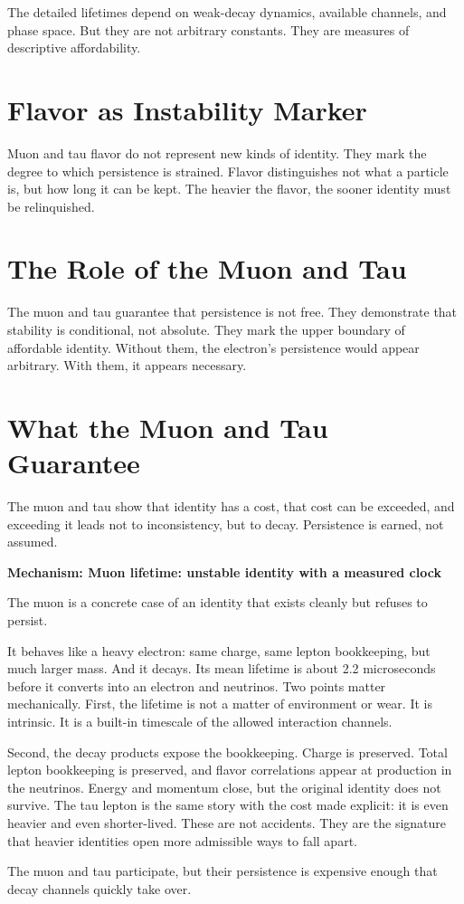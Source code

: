 \documentclass[11pt,twoside,openright]{book}
\newenvironment{mechanismbox}[1]
  {\begin{framed}\noindent\textbf{Mechanism: #1}\par\medskip}
  {\end{framed}}
\begin{document}
The detailed lifetimes depend on weak-decay dynamics, available channels, and phase space. But they are not arbitrary constants. They are measures of descriptive affordability.

\section*{Flavor as Instability Marker}

Muon and tau flavor do not represent new kinds of identity. They mark the degree to which persistence is strained. Flavor distinguishes not what a particle is, but how long it can be kept. The heavier the flavor, the sooner identity must be relinquished.

\section*{The Role of the Muon and Tau}

The muon and tau guarantee that persistence is not free. They demonstrate that stability is conditional, not absolute. They mark the upper boundary of affordable identity. Without them, the electron's persistence would appear arbitrary. With them, it appears necessary.

\section*{What the Muon and Tau Guarantee}

The muon and tau show that identity has a cost, that cost can be exceeded, and exceeding it leads not to inconsistency, but to decay. Persistence is earned, not assumed.

\begin{mechanismbox}{Muon lifetime: unstable identity with a measured clock}
The muon is a concrete case of an identity that exists cleanly but refuses to persist.

It behaves like a heavy electron: same charge, same lepton bookkeeping, but much larger mass. And it decays. Its mean lifetime is about 2.2 microseconds before it converts into an electron and neutrinos. Two points matter mechanically. First, the lifetime is not a matter of environment or wear. It is intrinsic. It is a built-in timescale of the allowed interaction channels.

Second, the decay products expose the bookkeeping. Charge is preserved. Total lepton bookkeeping is preserved, and flavor correlations appear at production in the neutrinos. Energy and momentum close, but the original identity does not survive. The tau lepton is the same story with the cost made explicit: it is even heavier and even shorter-lived. These are not accidents. They are the signature that heavier identities open more admissible ways to fall apart.

The muon and tau participate,
but their persistence is expensive enough
that decay channels quickly take over.
\end{mechanismbox}
\end{document}
